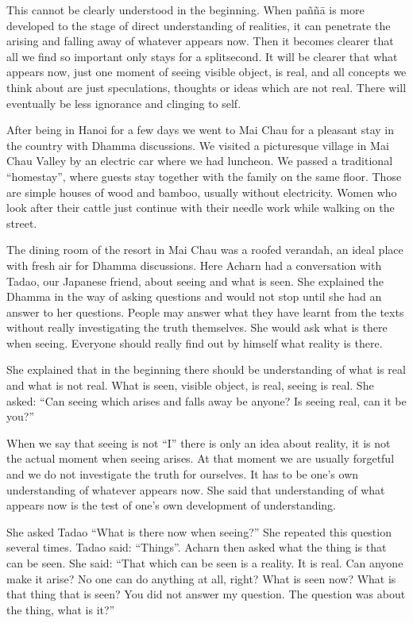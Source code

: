 This cannot be clearly understood in the beginning. When paññā is more
developed to the stage of direct understanding of realities, it can
penetrate the arising and falling away of whatever appears now. Then it
becomes clearer that all we find so important only stays for a
splitsecond. It will be clearer that what appears now, just one moment
of seeing visible object, is real, and all concepts we think about are
just speculations, thoughts or ideas which are not real. There will
eventually be less ignorance and clinging to self.

After being in Hanoi for a few days we went to Mai Chau for a pleasant
stay in the country with Dhamma discussions. We visited a picturesque
village in Mai Chau Valley by an electric car where we had luncheon. We
passed a traditional ``homestay'', where guests stay together with the
family on the same floor. Those are simple houses of wood and bamboo,
usually without electricity. Women who look after their cattle just
continue with their needle work while walking on the street.

The dining room of the resort in Mai Chau was a roofed verandah, an ideal
place with fresh air for Dhamma discussions. Here Acharn had a
conversation with Tadao, our Japanese friend, about seeing and what is
seen. She explained the Dhamma in the way of asking questions and
would not stop until she had an answer to her questions. People may
answer what they have learnt from the texts without really investigating
the truth themselves. She would ask what is there when seeing. Everyone
should really find out by himself what reality is there.

She explained that in the beginning there should be understanding of
what is real and what is not real. What is seen, visible object, is
real, seeing is real. She asked: ``Can seeing which arises and falls
away be anyone? Is seeing real, can it be you?''

When we say that seeing is not ``I'' there is only an idea about
reality, it is not the actual moment when seeing arises. At that moment
we are usually forgetful and we do not investigate the truth for
ourselves. It has to be one's own understanding of whatever appears now.
She said that understanding of what appears now is the test of one's own
development of understanding.

She asked Tadao ``What is there now when seeing?'' She repeated this
question several times. Tadao said: ``Things''. Acharn then asked what
the thing is that can be seen. She said: ``That which can be seen is a
reality. It is real. Can anyone make it arise? No one can do anything at
all, right? What is seen now? What is that thing that is seen? You did
not answer my question. The question was about the thing, what is it?''

